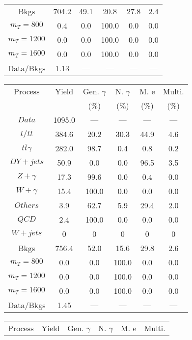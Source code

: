 \begin{figure}
\begin{minipage}[c]{0.32\textwidth}
{\begin{tabular}{cccccc}
Bkgs &  704.2 &  49.1 &  20.8 &  27.8 &  2.4\\
$ m_{T} = 800 $ &  0.4 &  0.0 &  100.0 &  0.0 &  0.0\\
$ m_{T} = 1200 $ &  0.0 &  0.0 &  100.0 &  0.0 &  0.0\\
$ m_{T} = 1600 $ &  0.0 &  0.0 &  100.0 &  0.0 &  0.0\\
Data/Bkgs &  1.13 &  --- &  --- &  --- &  ---\\
\hline
\end{tabular}
}
\end{minipage}
\begin{minipage}[c]{0.32\textwidth}
\centering
\tiny{
\begin{tabular}{cccccc}
\hline
Process & Yield & Gen. $\gamma$ & N. $\gamma$ & M. e & Multi. \\
 &  & (\%) & (\%) & (\%) & (\%)  \\
\hline
                                                                      $ Data $ &  1095.0 &  --- &  --- &  --- &  ---\\
$ t/t\bar{t} $ &  384.6 &  20.2 &  30.3 &  44.9 &  4.6\\
$ t\bar{t}\gamma $ &  282.0 &  98.7 &  0.4 &  0.8 &  0.2\\
$ DY+jets $ &  50.9 &  0.0 &  0.0 &  96.5 &  3.5\\
$ Z+\gamma $ &  17.3 &  99.6 &  0.0 &  0.4 &  0.0\\
$ W+\gamma $ &  15.4 &  100.0 &  0.0 &  0.0 &  0.0\\
$ Others $ &  3.9 &  62.7 &  5.9 &  29.4 &  2.0\\
$ QCD $ &  2.4 &  100.0 &  0.0 &  0.0 &  0.0\\
$ W+jets $ &  0 &  0 &  0 &  0 &  0\\
Bkgs &  756.4 &  52.0 &  15.6 &  29.8 &  2.6\\
$ m_{T} = 800 $ &  0.0 &  0.0 &  100.0 &  0.0 &  0.0\\
$ m_{T} = 1200 $ &  0.0 &  0.0 &  100.0 &  0.0 &  0.0\\
$ m_{T} = 1600 $ &  0.0 &  0.0 &  100.0 &  0.0 &  0.0\\
Data/Bkgs &  1.45 &  --- &  --- &  --- &  ---\\
\hline
\end{tabular}
}
\end{minipage}
\begin{minipage}[c]{0.32\textwidth}
\centering
\tiny{
\begin{tabular}{cccccc}
\hline
Process & Yield & Gen. $\gamma$ & N. $\gamma$ & M. e & Multi. \\

\end{tabular}}
\end{minipage}
\end{figure}
